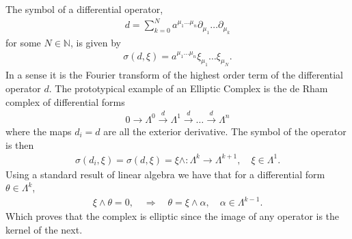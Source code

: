 \documentclass[10pt]{report}
\theoremstyle{definition}
\begin{document}
The symbol of a differential operator,
\begin{align}
    d = \sum_{k=0}^N a^{\mu_1\ldots \mu_n} \partial_{\mu_1} \ldots \partial_{\mu_k}
\end{align}
for some $N \in \mathbb{N}$, is given by 
\begin{align}
    \sigma(d,\xi) = a^{\mu_1\ldots\mu_n} \xi_{\mu_1} \ldots \xi_{\mu_N}.
\end{align}
In a sense it is the Fourier transform of the highest order term of the differential operator $d$. The prototypical example of an Elliptic Complex is the de Rham complex of differential forms 
\begin{align}
    0 \longrightarrow \Lambda^0 \overset{d}{\longrightarrow} \Lambda^1 \overset{d}{\longrightarrow} \ldots \overset{d}{\longrightarrow} \Lambda^n
\end{align}
where the maps $d_i = d$ are all the exterior derivative. The symbol of the operator is then 
\begin{align}
    \sigma(d_i,\xi) = \sigma(d,\xi) = \xi \wedge : \Lambda^k \rightarrow \Lambda^{k+1}, \quad \xi \in \Lambda^1.
\end{align}
Using a standard result of linear algebra we have that for a differential form $\theta \in \Lambda^k$,
\begin{align}
    \xi \wedge \theta = 0, \quad \Rightarrow \quad \theta = \xi \wedge \alpha, \quad \alpha \in \Lambda^{k-1}.
\end{align}
Which proves that the complex is elliptic since the image of any operator is the kernel of the next.
\end{document}
